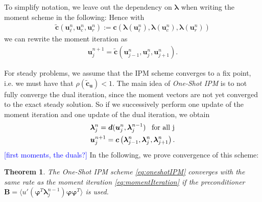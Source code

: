 \documentclass[10pt, a4paper, titlepage, bibliography=totocnumbered]{article}
\newtheorem{theorem}{Theorem}[section]
\begin{document}
To simplify notation, we leave out the dependency on $\bm{\lambda}$ when writing the moment scheme in the following: Hence with 
\begin{align*}
\bm{\tilde c}\left(\bm{u}_{\ell}^n,\bm{u}_{c}^n,\bm{u}_{r}^n\right):=\bm{c}\left(\bm{\lambda}(\bm{u}_{\ell}^n),\bm{\lambda}(\bm{u}_{c}^n),\bm{\lambda}(\bm{u}_{r}^n)\right)
\end{align*}
we can rewrite the moment iteration as
\begin{align}
\bm{u}_j^{n+1} = \bm{\tilde c}\left(\bm{u}_{j-1}^n,\bm{u}_{j}^n,\bm{u}_{j+1}^n\right).
\end{align}

For steady problems, we assume that the IPM scheme converges to a fix point, i.e. we must have that $\rho (\bm{\tilde c}_{\bm{u}})<1$. The main idea of \textit{One-Shot IPM} is to not fully converge the dual iteration, since the moment vectors are not yet converged to the exact steady solution. So if we successively perform one update of the moment iteration and one update of the dual iteration, we obtain 
\begin{subequations}\label{eq:oneshotIPM}
\begin{align}
&\bm{\lambda}_{j}^{n} =  \bm{d}(\bm{u}_j^{n},\bm{\lambda}_j^{n-1}) \enskip \text{ for all j} \label{eq:oneshotIPMdual}\\
&\bm{u}_j^{n+1} =  \bm{c}\left(\bm{\lambda}_{j-1}^n,\bm{\lambda}_{j}^n,\bm{\lambda}_{j+1}^n\right)\label{eq:oneshotIPMmoment}.
\end{align}
\end{subequations}
\textcolor{blue}{[first moments, the duals?]}
In the following, we prove convergence of this scheme:
\begin{theorem}
The \textit{One-Shot IPM} scheme \eqref{eq:oneshotIPM} converges with the same rate as the moment iteration \eqref{eq:momentIteration} if the preconditioner $\bm{B} = \langle u'(\bm{\varphi}^T\bm{\lambda}_j^{n-1})\bm{\varphi}\bm{\varphi}^T\rangle$ is used.
\end{theorem}
\end{document}
